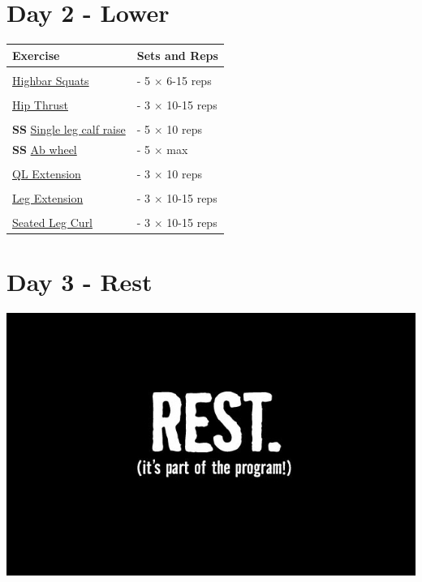 \documentclass[11pt]{article}
\begin{document}
\section*{Day 2 - Lower}
\begin{center}
\begin{tabular}{|l|l|}
\hline
\textbf{Exercise} & \textbf{Sets and Reps}\\
\hline
&\\
\href{https://www.youtube.com/watch?v=zoZWgTrZLd8}{ Highbar Squats} & - 5 $\times$ 6-15 reps \\
\hline
&\\
\href {https://www.youtube.com/watch?v=Zp26q4BY5HE}{Hip Thrust } & - 3 $\times$  10-15 reps \\
\hline
&\\
\textbf{SS} \href{https://www.youtube.com/watch?v=DlcI-MK6jAA}{Single leg calf raise} & - 5 $\times$ 10 reps \\
\textbf{SS} \href{https://www.youtube.com/shorts/7GNGzZiyDhE}{Ab wheel} &-  5 $\times$ max \\
\hline
&\\
\href{https://www.youtube.com/shorts/MVu18rxmukk}{QL Extension} & - 3 $\times$ 10 reps \\
\hline
&\\
\href{https://www.youtube.com/watch?v=swZQC689o9U}{Leg Extension} & - 3 $\times$ 10-15 reps \\
\hline
&\\
\href{https://www.youtube.com/watch?v=oFxEDkppbSQ}{Seated Leg Curl} & - 3 $\times$ 10-15 reps \\
\hline
\end{tabular}
\end{center}

\section*{Day 3 - Rest}
\includegraphics[width=\textwidth]{rest.jpg}
\end{document}
